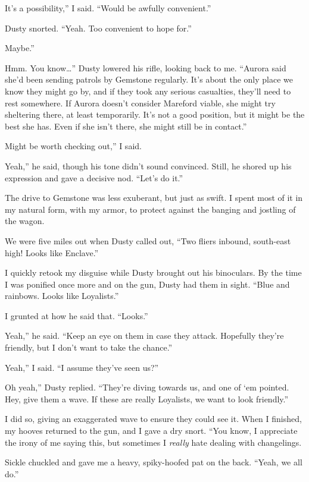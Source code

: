 \leavevmode{}It’s a possibility,” I said. “Would be awfully convenient.”

Dusty snorted. “Yeah. Too convenient to hope for.”

\leavevmode{}Maybe.”

\leavevmode{}Hmm. You know…” Dusty lowered his rifle, looking back to me. “Aurora said she’d been sending patrols by Gemstone regularly. It’s about the only place we know they might go by, and if they took any serious casualties, they’ll need to rest somewhere. If Aurora doesn’t consider Mareford viable, she might try sheltering there, at least temporarily. It’s not a good position, but it might be the best she has. Even if she isn’t there, she might still be in contact.”

\leavevmode{}Might be worth checking out,” I said.

\leavevmode{}Yeah,” he said, though his tone didn’t sound convinced. Still, he shored up his expression and gave a decisive nod. “Let’s do it.”

{\br}%
The drive to Gemstone was less exuberant, but just as swift. I spent most of it in my natural form, with my armor, to protect against the banging and jostling of the wagon.

We were five miles out when Dusty called out, “Two fliers inbound, south-east high! Looks like Enclave.”

I quickly retook my disguise while Dusty brought out his binoculars. By the time I was ponified once more and on the gun, Dusty had them in sight. “Blue and rainbows. Looks like Loyalists.”

I grunted at how he said that. “Looks.”

\leavevmode{}Yeah,” he said. “Keep an eye on them in case they attack. Hopefully they’re friendly, but I don’t want to take the chance.”

\leavevmode{}Yeah,” I said. “I assume they’ve seen us?”

\leavevmode{}Oh yeah,” Dusty replied. “They’re diving towards us, and one of ‘em pointed. Hey, give them a wave. If these are really Loyalists, we want to look friendly.”

I did so, giving an exaggerated wave to ensure they could see it. When I finished, my hooves returned to the gun, and I gave a dry snort. “You know, I appreciate the irony of me saying this, but sometimes I \textit{really} hate dealing with changelings.

Sickle chuckled and gave me a heavy, spiky-hoofed pat on the back. “Yeah, we all do.”

